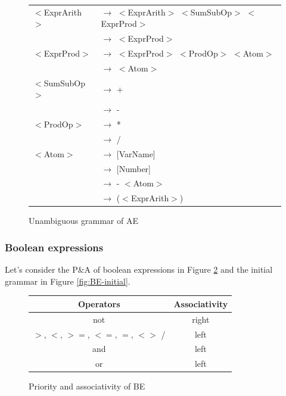 \documentclass[letterpaper]{article}
\begin{document}
\begin{figure}[H]
    \centering
    \begin{tabular}{l l}
        $<$ExprArith$>$ &$\rightarrow$
        $<$ExprArith$>$ $<$SumSubOp$>$ $<$ExprProd$>$ \\
         &$\rightarrow$ $<$ExprProd$>$ \\
        $<$ExprProd$>$ &$\rightarrow$
        $<$ExprProd$>$ $<$ProdOp$>$ $<$Atom$>$ \\
         &$\rightarrow$ $<$Atom$>$ \\

        $<$SumSubOp$>$ &$\rightarrow$ + \\
         &$\rightarrow$ - \\

        $<$ProdOp$>$ &$\rightarrow$ * \\
         &$\rightarrow$ / \\

        $<$Atom$>$ &$\rightarrow$ [VarName] \\
         &$\rightarrow$ [Number] \\
         &$\rightarrow$ - $<$Atom$>$ \\
         &$\rightarrow$ ($<$ExprArith$>$) \\
    \end{tabular}
    \caption{Unambiguous grammar of AE}
    \label{fig:AE-unambi}
\end{figure}


\subsubsection{Boolean expressions}

Let's consider the P\&A of boolean expressions in Figure \ref{fig:BE-pa}
and the initial grammar in Figure \ref{fig:BE-initial}.

\begin{figure}[H]
    \centering
    \begin{tabular}{|c|c|}
        \hline
        Operators & Associativity \\
        \hline
        \hline
        not & right \\
        \hline
        $>$, $<$, $>=$, $<=$, $=$, $<>$ / & left \\
        \hline
        and & left \\
        \hline
        or & left \\
        \hline
    \end{tabular}
    \caption{Priority and associativity of BE}
    \label{fig:BE-pa}
\end{figure}
\end{document}

